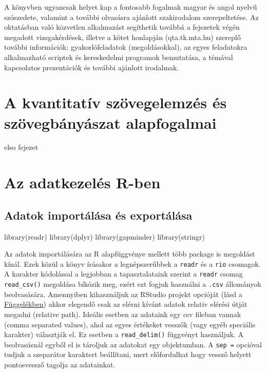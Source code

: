 \documentclass[
]{book}
\newenvironment{Shaded}{\begin{snugshade}}{\end{snugshade}}
\newcommand{\FunctionTok}[1]{\textcolor[rgb]{0.00,0.00,0.00}{#1}}
\newcommand{\NormalTok}[1]{#1}
\begin{document}
A könyvben ugyancsak helyet kap a fontosabb fogalmak magyar és angol
nyelvű szószedete, valamint a további olvasásra ajánlott szakirodalom
szerepeltetése. Az oktatásban való közvetlen alkalmazást segíthetik
továbbá a fejezetek végén megadott vizsgakérdések, illetve a kötet
honlapján (qta.tk.mta.hu) szereplő további információk:
gyakorlófeladatok (megoldásokkal), az egyes feladatokra alkalmazható
scriptek és kereskedelmi programok bemutatása, a témával kapcsolatos
prezentációk és további ajánlott irodalmak.

\hypertarget{a-kvantitatuxedv-szuxf6vegelemzuxe9s-uxe9s-szuxf6vegbuxe1nyuxe1szat-alapfogalmai}{%
\chapter{A kvantitatív szövegelemzés és szövegbányászat
alapfogalmai}\label{a-kvantitatuxedv-szuxf6vegelemzuxe9s-uxe9s-szuxf6vegbuxe1nyuxe1szat-alapfogalmai}}

elso fejezet

\hypertarget{az-adatkezeluxe9s-r-ben}{%
\chapter{Az adatkezelés R-ben}\label{az-adatkezeluxe9s-r-ben}}

\hypertarget{adatok-importuxe1luxe1sa-uxe9s-exportuxe1luxe1sa}{%
\section{Adatok importálása és
exportálása}\label{adatok-importuxe1luxe1sa-uxe9s-exportuxe1luxe1sa}}

\begin{Shaded}
\begin{Highlighting}[]
\FunctionTok{library}\NormalTok{(readr)}
\FunctionTok{library}\NormalTok{(dplyr)}
\FunctionTok{library}\NormalTok{(gapminder)}
\FunctionTok{library}\NormalTok{(stringr)}
\end{Highlighting}
\end{Shaded}

Az adatok importálására az R alapfüggvénye mellett több package is
megoldást kínál. Ezek közül a könyv írásakor a legnépszerűbbek a
\texttt{readr} és a \texttt{rio} csomagok. A karakter kódolással a
legjobban a tapasztalataink szerint a \texttt{readr} csomag
\texttt{read\_csv()} megoldása bíkózik meg, ezért ezt fogjuk használni a
\texttt{.csv} állományok beolvasására. Amennyiben kihasználjuk az
RStudio projekt opcióját (lásd a
\protect\hyperlink{projektmunka}{Függelékben}) akkor elegendő csak az
elérni kívánt adatok relativ elérési útját megadni (relative path).
Ideális esetben az adataink egy csv fileban vannak (comma separated
values), ahol az egyes értékeket vesszők (vagy egyéb speciális karakter)
választják el. Ez esetben a \texttt{read\_delim()} függvényt használjuk.
A beolvasásnál egyből el is tároljuk az adatokat egy objektumban. A
\texttt{sep\ =} opcióval tudjuk a szeparátor karaktert beállítani, mert
előfordulhat hogy vessző helyett pontosvessző tagolja az adatainkat.
\end{document}
